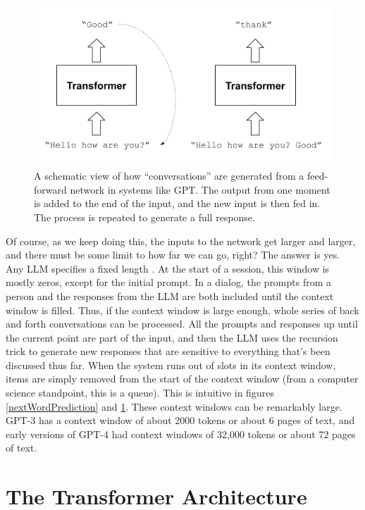 \begin{figure}[h]
\centering
\includegraphics[scale=.7]{./images/gptRecursedInputs.png}
\caption[Jeff Yoshimi]{A schematic view of how ``conversations'' are generated from a feed-forward network in systems like GPT. The output from one moment is added to the end of the input, and the new input is then fed in. The process is repeated to generate a full response.}
\label{gptRecursedInputs}
\end{figure}

Of course, as we keep doing this, the inputs to the network get larger and larger, and there must be some limit to how far we can go, right? The answer is yes. Any LLM specifies a fixed length . At the start of a session, this window is mostly zeros, except for the initial prompt. In a dialog, the prompts from a person and the responses from the LLM are both included until the context window is filled. Thus, if the context window is large enough, whole series of back and forth conversations can be processed. All the prompts and responses up until the current point are part of the input, and then the LLM uses the recursion trick to generate new responses that are sensitive to everything that's been discussed thus far. When the system runs out of slots in its context window, items are simply removed from the start of the context window (from a computer science standpoint, this is a queue). This is intuitive in figures \ref{nextWordPrediction} and \ref{gptRecursedInputs}. These context windows can be remarkably large. GPT-3 has a context window of about 2000 tokens or about 6 pages of text, and early versions of GPT-4 had context windows of 32,000 tokens or about 72 pages of text. 

\section{The Transformer Architecture}\label{transformers}

